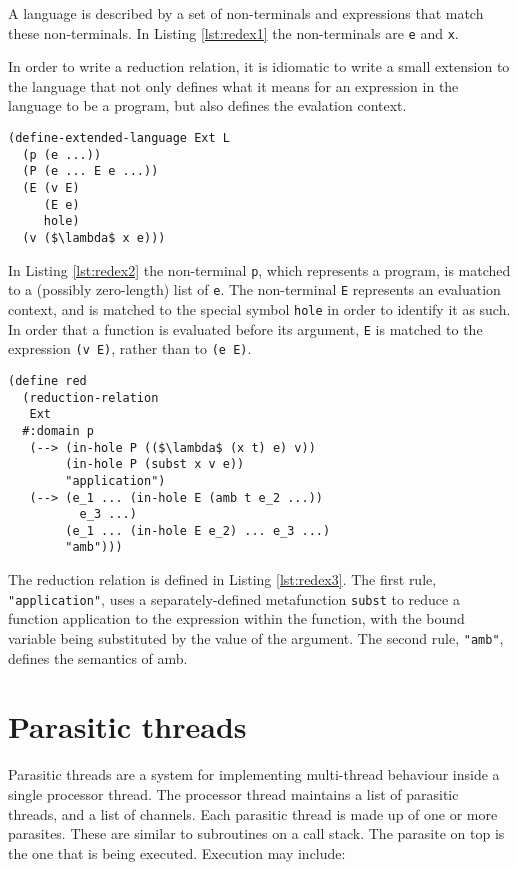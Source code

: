 \documentclass[12pt,a4paper,twoside,openright]{report}
\begin{document}
A language is described by a set of non-terminals and expressions that match these non-terminals. In Listing \ref{lst:redex1} the non-terminals are \texttt{e} and \texttt{x}.

In order to write a reduction relation, it is idiomatic to write a small extension to the language that not only defines what it means for an expression in the language to be a program, but also defines the evalation context.

\begin{lstlisting}[caption=An extended language based on L,label={lst:redex2}]
(define-extended-language Ext L
  (p (e ...))
  (P (e ... E e ...))
  (E (v E)
     (E e)
     hole)
  (v ($\lambda$ x e)))
\end{lstlisting}

In Listing \ref{lst:redex2} the non-terminal \texttt{p}, which represents a program, is matched to a (possibly zero-length) list of \texttt{e}. The non-terminal \texttt{E} represents an evaluation context, and is matched to the special symbol \texttt{hole} in order to identify it as such. In order that a function is evaluated before its argument, \texttt{E} is matched to the expression \texttt{(v E)}, rather than to \texttt{(e E)}.

\begin{lstlisting}[caption=Defining a reduction relation in PLT Redex,label={lst:redex3}]
(define red
  (reduction-relation
   Ext
  #:domain p
   (--> (in-hole P (($\lambda$ (x t) e) v))
        (in-hole P (subst x v e))
        "application")
   (--> (e_1 ... (in-hole E (amb t e_2 ...)) 
          e_3 ...)
        (e_1 ... (in-hole E e_2) ... e_3 ...)
        "amb")))
\end{lstlisting}

The reduction relation is defined in Listing \ref{lst:redex3}. The first rule, \texttt{"application"}, uses a separately-defined metafunction \texttt{subst} to reduce a function application to the expression within the function, with the bound variable being substituted by the value of the argument. The second rule, \texttt{"amb"}, defines the semantics of amb.

\section{Parasitic threads}
Parasitic threads are a system for implementing multi-thread behaviour inside a single processor thread. The processor thread maintains a list of parasitic threads, and a list of channels. Each parasitic thread is made up of one or more parasites. These are similar to subroutines on a call stack. The parasite on top is the one that is being executed. Execution may include: 
\end{document}
